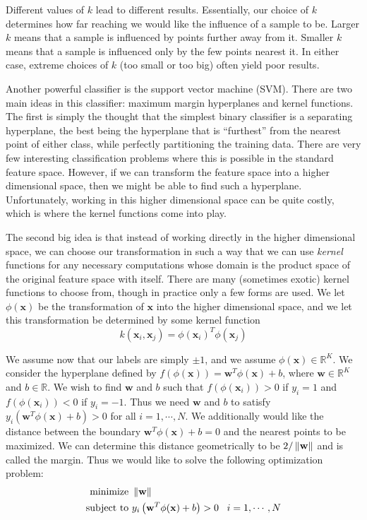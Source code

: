 Different values of $k$ lead to different results. Essentially, our choice of $k$ determines how far reaching we would like the influence of a sample to be. Larger $k$ means that a sample is influenced by points further away from it. Smaller $k$ means that a sample is influenced only by the few points nearest it. In either case, extreme choices of $k$ (too small or too big) often yield poor results.

Another powerful classifier is the support vector machine (SVM). There are two main ideas in this classifier: maximum margin hyperplanes and kernel functions. The first is simply the thought that the simplest binary classifier is a separating hyperplane, the best being the hyperplane that is ``furthest'' from the nearest point of either class, while perfectly partitioning the training data. There are very few interesting classification problems where this is possible in the standard feature space. However, if we can transform the feature space into a higher dimensional space, then we might be able to find such a hyperplane. Unfortunately, working in this higher dimensional space can be quite costly, which is where the kernel functions come into play.

The second big idea is that instead of working directly in the higher dimensional space, we can choose our transformation in such a way that we can use \emph{kernel} functions for any necessary computations whose domain is the product space of the original feature space with itself. There are many (sometimes exotic) kernel functions to choose from, though in practice only a few forms are used. We let $\phi(\mathbf{x})$ be the transformation of $\mathbf{x}$ into the higher dimensional space, and we let this transformation be determined by some kernel function
\begin{equation*}
k(\mathbf{x}_{i},\mathbf{x}_{j}) = \phi(\mathbf{x}_{i})^{T}\phi(\mathbf{x}_{j})
\end{equation*}

We assume now that our labels are simply $\pm 1$, and we assume $\phi(\mathbf{x}) \in \mathbb{R}^{K}$. We consider the hyperplane defined by $f(\phi(\mathbf{x})) = \mathbf{w}^{T}\phi(\mathbf{x}) + b$, where $\mathbf{w} \in \mathbb{R}^{K}$ and $b \in \mathbb{R}$. We wish to find $\mathbf{w}$ and $b$ such that $f(\phi(\mathbf{x}_{i})) > 0$ if $y_{i} = 1$ and $f(\phi(\mathbf{x}_{i})) < 0$ if $y_{i} = -1$. Thus we need $\mathbf{w}$ and $b$ to satisfy $y_{i}\left( \mathbf{w}^{T}\phi(\mathbf{x}) + b\right) > 0$ for all $i = 1, \cdots, N$. We additionally would like the distance between the boundary $\mathbf{w}^{T}\phi(\mathbf{x}) + b = 0$ and the nearest points to be maximized. We can determine this distance geometrically to be $2/\left\lVert\mathbf{w}\right\rVert$ and is called the margin. Thus we would like to solve the following optimization problem:
\begin{align*}
\text{minimize } & \left\lVert\mathbf{w}\right\rVert \\
\text{subject to } & y_{i}\left(\mathbf{w}^{T}\phi(\mathbf{x}) + b\right) > 0 \; \; \; i = 1, \cdots, N
\end{align*} 

